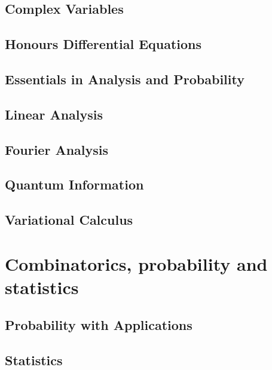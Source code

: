 \documentclass[12pt]{report}
\theoremstyle{definition}
\begin{document}
\chapter{Complex Variables}\label{cha:complex-variables}

\chapter{Honours Differential Equations}\label{cha:hono-diff-equat}

\chapter{Essentials in Analysis and Probability\label{cha:essent-analys-prob}}

\chapter{Linear Analysis}\label{cha:linear-analysis}

\chapter{Fourier Analysis}\label{cha:fourier-analysis}

\chapter{Quantum Information}\label{cha:quantum-information}

\chapter{Variational Calculus}\label{cha:variational-calculus}


\part{Combinatorics, probability and statistics}

\chapter{Probability with Applications}\label{cha:prob-with-appl}

\chapter{Statistics}\label{cha:statistics}
\end{document}
